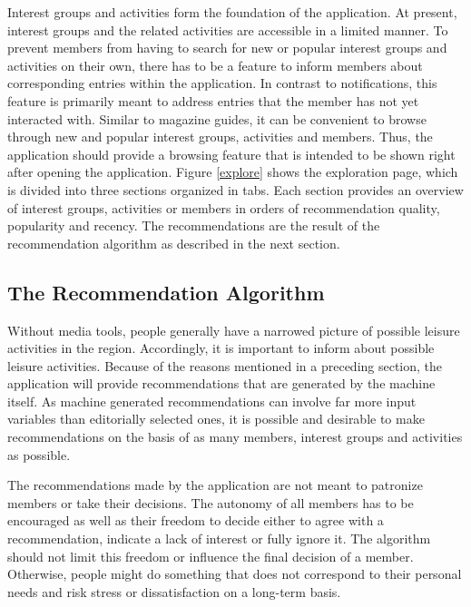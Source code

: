 \documentclass[12pt,numbers=noenddot,parskip,bibliography=totocnumbered,listof=totocnumbered]{scrreprt}
\begin{document}
Interest groups and activities form the foundation of the application. At present, interest groups and the related activities are accessible in a limited manner. To prevent members from having to search for new or popular interest groups and activities on their own, there has to be a feature to inform members about corresponding entries within the application. In contrast to notifications, this feature is primarily meant to address entries that the member has not yet interacted with. Similar to magazine guides, it can be convenient to browse through new and popular interest groups, activities and members. Thus, the application should provide a browsing feature that is intended to be shown right after opening the application. Figure \ref{explore} shows the exploration page, which is divided into three sections organized in tabs. Each section provides an overview of interest groups, activities or members in orders of recommendation quality, popularity and recency. The recommendations are the result of the recommendation algorithm as described in the next section.

\subsection{The Recommendation Algorithm}
Without media tools, people generally have a narrowed picture of possible leisure activities in the region. Accordingly, it is important to inform about possible leisure activities. Because of the reasons mentioned in a preceding section, the application will provide recommendations that are generated by the machine itself. As machine generated recommendations can involve far more input variables than editorially selected ones, it is possible and desirable to make recommendations on the basis of as many members, interest groups and activities as possible.

The recommendations made by the application are not meant to patronize members or take their decisions. The autonomy of all members has to be encouraged as well as their freedom to decide either to agree with a recommendation, indicate a lack of interest or fully ignore it. The algorithm should not limit this freedom or influence the final decision of a member. Otherwise, people might do something that does not correspond to their personal needs and risk stress or dissatisfaction on a long-term basis.
\end{document}
